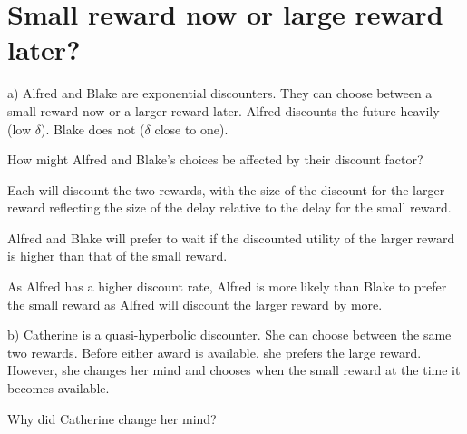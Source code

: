 \documentclass[
  letterpaper,
  DIV=11,
  numbers=noendperiod]{scrreprt}
\begin{document}
\hypertarget{small-reward-now-or-large-reward-later}{%
\section{Small reward now or large reward
later?}\label{small-reward-now-or-large-reward-later}}

a) Alfred and Blake are exponential discounters. They can choose between
a small reward now or a larger reward later. Alfred discounts the future
heavily (low \(\delta\)). Blake does not (\(\delta\) close to one).

How might Alfred and Blake's choices be affected by their discount
factor?

\begin{tcolorbox}[enhanced jigsaw, title=\textcolor{quarto-callout-tip-color}{\faLightbulb}\hspace{0.5em}{Answer}, toprule=.15mm, colback=white, breakable, titlerule=0mm, colframe=quarto-callout-tip-color-frame, coltitle=black, opacityback=0, rightrule=.15mm, colbacktitle=quarto-callout-tip-color!10!white, bottomtitle=1mm, opacitybacktitle=0.6, arc=.35mm, bottomrule=.15mm, toptitle=1mm, leftrule=.75mm, left=2mm]

Each will discount the two rewards, with the size of the discount for
the larger reward reflecting the size of the delay relative to the delay
for the small reward.

Alfred and Blake will prefer to wait if the discounted utility of the
larger reward is higher than that of the small reward.

As Alfred has a higher discount rate, Alfred is more likely than Blake
to prefer the small reward as Alfred will discount the larger reward by
more.

\end{tcolorbox}

b) Catherine is a quasi-hyperbolic discounter. She can choose between
the same two rewards. Before either award is available, she prefers the
large reward. However, she changes her mind and chooses when the small
reward at the time it becomes available.

Why did Catherine change her mind?
\end{document}
